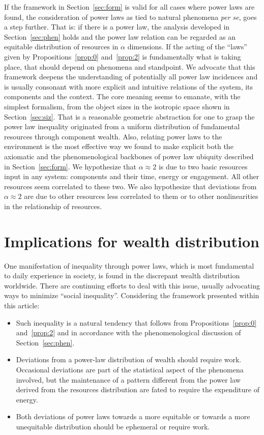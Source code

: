 \documentclass[10pt,letterpaper]{article}
\begin{document}
If the framework in Section~\ref{sec:form} is valid for all cases where power laws are found,
the consideration of power laws as tied to natural phenomena \emph{per se}, goes a step further. 
That is: if there is
a power law, the analysis developed in Section~\ref{sec:phen} holds
and
the power law relation can be regarded as an equitable distribution
of resources in $\alpha$ dimensions.
If the acting of the ``laws'' given by Propositions~\ref{prop:0} and~\ref{prop:2} is fundamentally what is taking place, that should depend on phenomena
and standpoint.
We advocate that this framework deepens the understanding of potentially all power law
incidences and is usually consonant with more explicit and intuitive 
relations of the system, its components and the context.
The core meaning seems to emanate, with the simplest formalism, from
the object sizes in the isotropic space shown in Section~\ref{sec:siz}.
That is a reasonable geometric abstraction for
one to grasp the power law inequality originated from
a uniform distribution
of fundamental resources through component wealth.
Also, relating power laws to the environment is the most effective
way we found to make explicit both the axiomatic
and the phenomenological backbones of power law ubiquity described in
Section~\ref{sec:form}.
We hypothesize that $\alpha \approx 2$ is due to two basic resources
input in any system: components and their time, energy or engagement.
All other resources seem correlated to these two.
We also hypothesize that deviations from $\alpha \approx 2$ are due
to other resources less correlated to them
or to other nonlinearities in the relationship of resources.

\section{Implications for wealth distribution}\label{sec:esp}

One manifestation of inequality through power laws,
which is most fundamental to daily experience
in society, is found in the discrepant wealth distribution worldwide.
There are continuing efforts to deal with this issue,
usually advocating ways to minimize ``social inequality''.
Considering the framework presented within this article:

\begin{itemize}
	\item Such inequality is a natural tendency that follows from Propositions~\ref{prop:0} and~\ref{prop:2} and in accordance with the phenomenological discussion of Section~\ref{sec:phen}.
	\item Deviations from a power-law distribution of wealth should require work.
		Occasional deviations are part of the statistical aspect of the phenomena involved, but the maintenance of a pattern different from the power law derived from the resources distribution are fated to require the expenditure of energy.
	\item Both deviations of power laws towards a more equitable or towards a more unequitable distribution should be ephemeral or require work.
\end{itemize}
\end{document}
